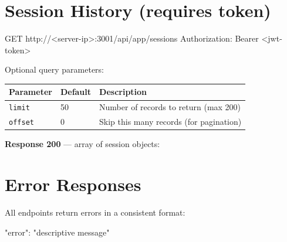 \documentclass[12pt,a4paper]{report}
\begin{document}
\section{Session History (requires token)}

\begin{codebox}
GET http://<server-ip>:3001/api/app/sessions
Authorization: Bearer <jwt-token>
\end{codebox}

Optional query parameters:

\begin{center}
\begin{tabularx}{0.75\linewidth}{l l X}
  \toprule
  \rowcolor{tablehead}\color{white}\textbf{Parameter} & \color{white}\textbf{Default} & \color{white}\textbf{Description} \\
  \midrule
  \texttt{limit}  & 50  & Number of records to return (max 200) \\
  \rowcolor{rowalt}
  \texttt{offset} & 0   & Skip this many records (for pagination) \\
  \bottomrule
\end{tabularx}
\end{center}

\textbf{Response 200} — array of session objects:
\begin{codebox}
\end{codebox}

\section{Error Responses}

All endpoints return errors in a consistent format:

\begin{codebox}
{ "error": "descriptive message" }
\end{codebox}
\end{document}
